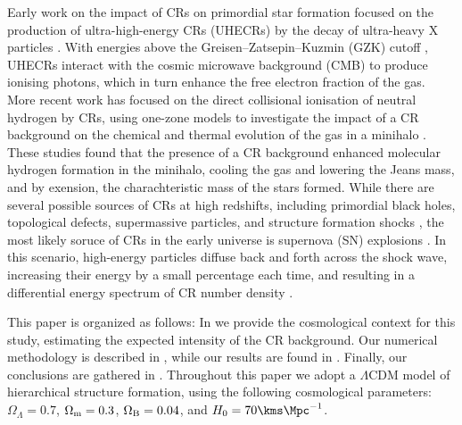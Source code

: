 Early work on the impact of CRs on primordial star formation focused on the production of ultra-high-energy CRs (UHECRs) by the decay of ultra-heavy X particles \citep{ShchekinovVasiliev2004,VasilievShchekinov2006,RipamontiMapelliFerrara2007}.  With energies above the Greisen--Zatsepin--Kuzmin (GZK) cutoff \citep{Greisen1966,ZatsepinKuzmin1966}, UHECRs interact with the cosmic microwave background (CMB) to produce ionising photons, which in turn enhance the free electron fraction of the gas.  More recent work has focused on the direct collisional ionisation of neutral hydrogen by CRs, using one-zone models to investigate the impact of a CR background on the chemical and thermal evolution of the gas in a minihalo \citep{StacyBromm2007,JascheCiardiEnsslin2007}.  These studies found that the presence of a CR background enhanced molecular hydrogen formation in the minihalo, cooling the gas and lowering the Jeans mass, and by exension, the charachteristic mass of the stars formed. While there are several possible sources of CRs at high redshifts, including primordial black holes, topological defects, supermassive particles, and structure formation shocks \citep{BiermannSigl2001,Stanev2004,Pfrommeretal2006}, the most likely soruce of CRs in the early universe is supernova (SN) explosions \citep[e.g.,][]{GinzburgSyrovatskii1969}.  In this scenario, high-energy particles diffuse back and forth across the shock wave, increasing their energy by a small percentage each time, and resulting in a differential energy spectrum of CR number density \citep{Longair1994}.

This paper is organized as follows: In  we provide the cosmological context for this study, estimating the expected intensity of the CR background. Our numerical methodology is described in , while our results are found in .  Finally, our conclusions are gathered in . Throughout this paper we adopt a $\Lambda$CDM model of hierarchical structure formation, using the following cosmological parameters: $\Omega_{\Lambda} = 0.7$, $\Omega_{\rm m} = 0.3$, $\Omega_{\rm B} = 0.04$, and $H_0 = 70 \kms \Mpc^{-1}$.